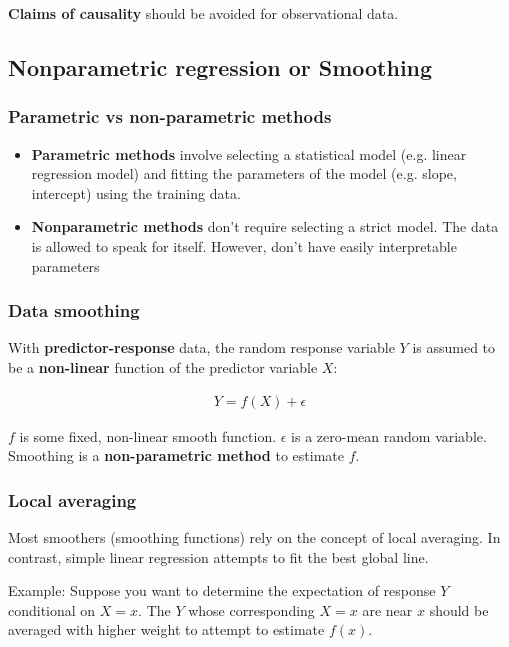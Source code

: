 \textbf{Claims of causality} should be avoided for observational data.

\subsection{Nonparametric regression or Smoothing}

\subsubsection{Parametric vs non-parametric methods}

\begin{itemize}
    \item \textbf{Parametric methods} involve selecting a statistical model (e.g. linear regression model) and fitting the parameters of the model (e.g. slope, intercept) using the training data.
    \item \textbf{Nonparametric methods} don’t require selecting a strict model. The data is allowed to speak for itself. However, don’t have easily interpretable parameters
\end{itemize}

\subsubsection{Data smoothing}

\indent 

With \textbf{predictor-response} data, the random response variable $Y$ is assumed to be a \textbf{non-linear} function of the predictor variable $X$:

\begin{align*}
    Y = f(X)+\epsilon
\end{align*}

$f$ is some fixed, non-linear smooth function. $\epsilon$ is a zero-mean random variable. Smoothing is a \textbf{non-parametric method} to estimate $f$.

\subsubsection{Local averaging}

\indent 

Most smoothers (smoothing functions) rely on the concept of local averaging. In contrast, simple linear regression attempts to fit the best global line.

Example: Suppose you want to determine the expectation of response $Y$ conditional on $X=x$. The $Y$ whose corresponding $X=x$ are near $x$ should be averaged with higher weight to attempt to estimate $f(x)$.

